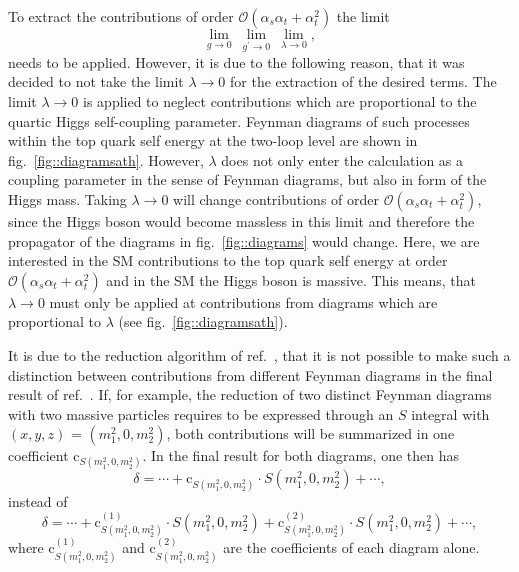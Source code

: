 \documentclass[a4paper,12pt]{book}
\begin{document}
To extract the contributions of order $\mathcal{O}(\alpha_s\alpha_t+\alpha_t^2)$ the limit 
\begin{equation}
\lim_{g \rightarrow 0} \> \lim_{g^\prime \rightarrow 0} \> \lim_{\lambda \rightarrow 0},
\end{equation}
needs to be applied. However, it is due to the following reason, that it was decided to not take the limit $\lambda \rightarrow 0$ for the extraction of the desired terms. The limit $\lambda \rightarrow 0$ is applied to neglect contributions which are proportional to the quartic Higgs self-coupling parameter. Feynman diagrams of such processes within the top quark self energy at the two-loop level are shown in fig.\ \ref{fig::diagramsath}. However, $\lambda$ does not only enter the calculation as a coupling parameter in the sense of Feynman diagrams, but also in form of the Higgs mass. Taking $\lambda \rightarrow 0$ will change contributions of order $\mathcal{O}(\alpha_s\alpha_t + \alpha_t^2)$, since the Higgs boson would become massless in this limit and therefore the propagator of the diagrams in fig.\ \ref{fig::diagrams} would change. Here, we are interested in the SM contributions to the top quark self energy at order $\mathcal{O}(\alpha_s\alpha_t + \alpha_t^2)$ and in the SM the Higgs boson is massive. This means, that $\lambda \rightarrow 0$ must only be applied at contributions from diagrams which are proportional to $\lambda$ (see fig.\ \ref{fig::diagramsath}).\par
It is due to the reduction algorithm of ref.\ \cite{tarasov}, that it is not possible to make such a distinction between contributions from different Feynman diagrams in the final result of ref.\ \cite{martinmain}. If, for example, the reduction of two distinct Feynman diagrams with two massive particles requires to be expressed through an $S$ integral with $(x,y,z)$ = $(m^2_1,0,m^2_2)$, both contributions will be summarized in one coefficient $\text{c}_{S(m^2_1,0,m^2_2)}$. In the final result for both diagrams, one then has 
\begin{equation}
\delta = \cdots + \text{c}_{S(m^2_1,0,m^2_2)} \cdot S(m_1^2,0,m_2^2) + \cdots,
\end{equation}
instead of 
\begin{equation}
\delta = \cdots + \text{c}^{(1)}_{S(m^2_1,0,m^2_2)} \cdot S(m_1^2,0,m_2^2) + \text{c}^{(2)}_{S(m^2_1,0,m^2_2)} \cdot S(m_1^2,0,m_2^2) + \cdots,
\end{equation}
where $\text{c}^{(1)}_{S(m^2_1,0,m^2_2)}$ and $\text{c}^{(2)}_{S(m^2_1,0,m^2_2)}$ are the coefficients of each diagram alone.\par
\end{document}
